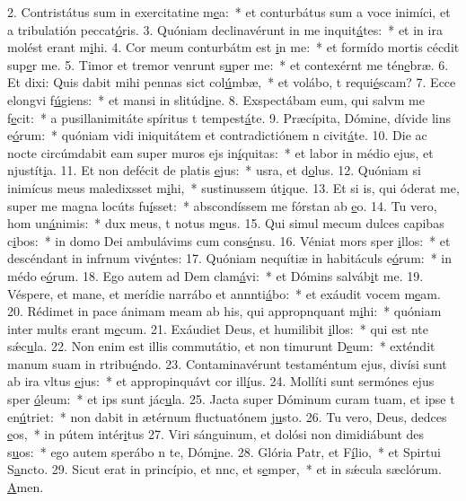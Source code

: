 2. Contristátus sum in exercitatine m\uline{e}a:~* et conturbátus sum a voce inimíci, et a tribulatión peccat\uline{ó}ris.
3. Quóniam declinavérunt in me inquit\uline{á}tes:~* et in ira molést erant m\uline{i}hi.
4. Cor meum conturbátm est \uline{i}n me:~* et formído mortis cécdit sup\uline{e}r me.
5. Timor et tremor venrunt s\uline{u}per me:~* et contexérnt me tén\uline{e}bræ.
6. Et dixi: Quis dabit mihi pennas sict col\uline{ú}mbæ,~* et volábo, t requi\uline{é}scam?
7. Ecce elongvi f\uline{ú}giens:~* et mansi in slitúd\uline{i}ne.
8. Exspectábam eum, qui salvm me f\uline{e}cit:~* a pusillanimitáte spíritus t tempest\uline{á}te.
9. Præcípita, Dómine, dívide lins e\uline{ó}rum:~* quóniam vidi iniquitátem et contradictiónem n civit\uline{á}te.
10. Die ac nocte circúmdabit eam super muros ejs in\uline{í}quitas:~* et labor in médio ejus, et njustít\uline{i}a.
11. Et non defécit de platis \uline{e}jus:~* usra, et d\uline{o}lus.
12. Quóniam si inimícus meus maledixsset m\uline{i}hi,~* sustinussem út\uline{i}que.
13. Et si is, qui óderat me, super me magna locúts fu\uline{í}sset:~* abscondíssem me fórstan ab \uline{e}o.
14. Tu vero, hom un\uline{á}nimis:~* dux meus, t notus m\uline{e}us.
15. Qui simul mecum dulces capibas c\uline{i}bos:~* in domo Dei ambulávims cum cons\uline{é}nsu.
16. Véniat mors sper \uline{i}llos:~* et descéndant in infrnum viv\uline{é}ntes:
17. Quóniam nequítiæ in habitáculs e\uline{ó}rum:~* in médo e\uline{ó}rum.
18. Ego autem ad Dem clam\uline{á}vi:~* et Dómins salváb\uline{i}t me.
19. Véspere, et mane, et merídie narrábo et annnti\uline{á}bo:~* et exáudit vocem m\uline{e}am.
20. Rédimet in pace ánimam meam ab his, qui appropnquant m\uline{i}hi:~* quóniam inter mults erant m\uline{e}cum.
21. Exáudiet Deus, et humilibit \uline{i}llos:~* qui est nte sǽc\uline{u}la.
22. Non enim est illis commutátio, et non timurunt D\uline{e}um:~* exténdit manum suam in rtribu\uline{é}ndo.
23. Contaminavérunt testaméntum ejus, divísi sunt ab ira vltus \uline{e}jus:~* et appropinquávt cor ill\uline{í}us.
24. Mollíti sunt sermónes ejus sper \uline{ó}leum:~* et ips sunt jác\uline{u}la.
25. Jacta super Dóminum curam tuam, et ipse t en\uline{ú}triet:~* non dabit in ætérnum fluctuatónem j\uline{u}sto.
26. Tu vero, Deus, dedces \uline{e}os,~* in pútem intér\uline{i}tus
27. Viri sánguinum, et dolósi non dimidiábunt des s\uline{u}os:~* ego autem sperábo n te, Dóm\uline{i}ne.
28. Glória Patr, et F\uline{í}lio,~* et Spirtui S\uline{a}ncto.
29. Sicut erat in princípio, et nnc, et s\uline{e}mper,~* et in sǽcula sæclórum. \uline{A}men.
